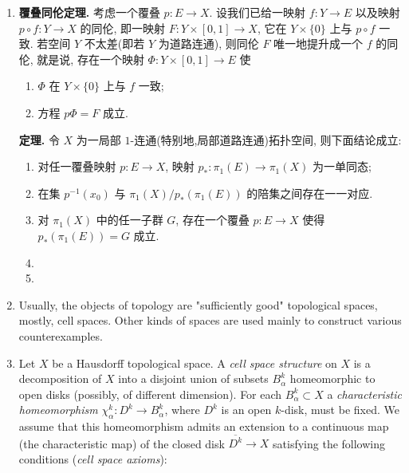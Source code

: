 \documentclass{ctexart}
\begin{document}
\begin{enumerate}
\item \textbf{覆叠同伦定理.} 考虑一个覆叠 $p : E \to X$. 设我们已给一映射 $f : Y \to E$ 以及映射 $p \circ f : Y \to X$ 的同伦, 即一映射 $F : Y \times [0,1] \to X$, 它在 $Y\times \{0\}$ 上与 $p\circ f$ 一致. 若空间 $Y$ 不太差(即若 $Y$ 为道路连通), 则同伦 $F$ 唯一地提升成一个 $f$ 的同伦, 就是说, 存在一个映射 $\Phi : Y\times [0,1]\to E$ 使
\begin{adjustwidth}{2em}{}
    \begin{enumerate}
      \item $\Phi$ 在 $Y\times \{0\}$ 上与 $f$ 一致;
      \item 方程 $p\Phi = F$ 成立.
    \end{enumerate}
\end{adjustwidth}
\begin{center}
\end{center}

\textbf{定理.} 令 $X$ 为一局部 $1$-连通(特别地,局部道路连通)拓扑空间, 则下面结论成立:
\begin{enumerate}
  \item 对任一覆叠映射 $p: E \to X$, 映射 $p_\ast: \pi_1(E) \to \pi_1(X)$ 为一单同态;
  \item 在集 $p^{-1}(x_0)$ 与 $\pi_1(X)/p_\ast(\pi_1(E))$ 的陪集之间存在一一对应.
  \item 对 $\pi_1(X)$ 中的任一子群 $G$, 存在一个覆叠 $p : E \to X$ 使得 $p_\ast(\pi_1(E)) = G$ 成立.
  \item 
  \item 
\end{enumerate}

\item Usually, the objects of topology are "sufficiently good"
  topological spaces, mostly, cell spaces. Other kinds of spaces are
  used mainly to construct various counterexamples.

\item Let $X$ be a Hausdorff topological space. A \textit{cell space
    structure} on $X$ is a decomposition of $X$ into a disjoint union
  of subsets $B_\alpha^k$ homeomorphic to open disks (possibly, of
  different dimension). For each $B_\alpha^k \subset X$ a
  \textit{characteristic homeomorphism} $\chi_\alpha^k : D^k \to
  B_\alpha^k$, where $D^k$ is an open $k$-disk, must be fixed. We
  assume that this homeomorphism admits an extension to a continuous
  map (the characteristic map) of the closed disk $\overline{D^k} \to X$
  satisfying the following conditions (\textit{cell space axioms}):


\end{enumerate}
\end{document}

